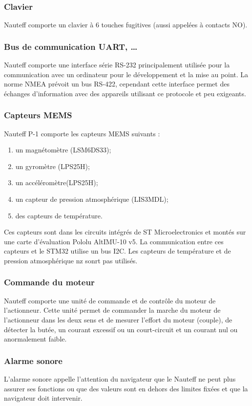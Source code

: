 \documentclass[a4paper,11pt]{report}
\begin{document}
\subsubsection{Clavier}
Nauteff comporte un clavier à 6 touches fugitives (aussi appelées à contacts NO).

\subsubsection{Bus de communication UART, \ldots}
Nauteff comporte une interface série RS-232 principalement utilisée
pour la communication avec un ordinateur pour le développement et
la mise au point.
La norme \gls{NMEA} prévoit un bus RS-422, cependant cette interface
permet des échanges d'information avec des appareils utilisant
ce protocole et peu exigeants.

\subsubsection{Capteurs MEMS}
Nauteff P-1 comporte les capteurs \gls{MEMS} suivants :
\begin{enumerate}
\item un magnétomètre (LSM6DS33);
\item un gyromètre (LPS25H);
\item un accéléromètre(LPS25H);
\item un capteur de pression atmosphérique (LIS3MDL);
\item des capteurs de température.
\end{enumerate}
Ces capteurs sont dans les circuits intégrés de ST Microelectronics et montés
sur une carte d'évaluation Pololu AltIMU-10 v5. La communication entre ces capteurs et le STM32 utilise un bus \gls{I2C}. Les capteurs de température et de pression atmosphérique nz sonrt pas utilisés.

\subsubsection{Commande du moteur}
Nauteff comporte une unité de commande et de contrôle du moteur de l'actionneur.
Cette unité permet de commander la marche du moteur de l'actionneur
dans les deux sens et de mesurer l'effort du moteur (couple),
de détecter la butée, un courant excessif ou un court-circuit et un courant nul
ou anormalement faible.
\subsubsection{Alarme sonore}
L'alarme sonore appelle l'attention du navigateur que le Nauteff ne peut plus
assurer ses fonctions ou que des valeurs sont en dehors des limites fixées
et que la navigateur doit intervenir.
\end{document}
